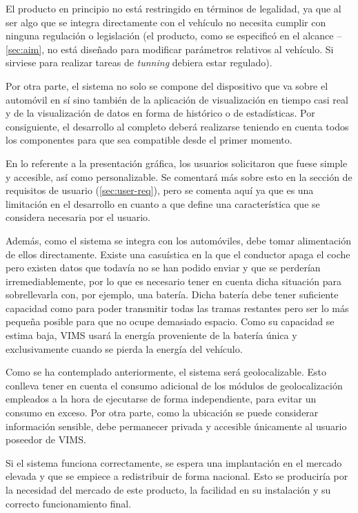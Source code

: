 El producto en principio no está restringido en términos de legalidad, ya que al
ser algo que se integra directamente con el vehículo no necesita cumplir con
ninguna regulación o legislación (el producto, como se especificó en el alcance
-- \ref{sec:aim}, no está diseñado para modificar parámetros relativos al
vehículo. Si sirviese para realizar tareas de \textit{tunning} debiera estar
regulado).

Por otra parte, el sistema no solo se compone del dispositivo que va sobre el
automóvil en sí sino también de la aplicación de visualización en tiempo casi
real y de la visualización de datos en forma de histórico o de estadísticas. Por
consiguiente, el desarrollo al completo deberá realizarse teniendo en cuenta
todos los componentes para que sea compatible desde el primer momento.

En lo referente a la presentación gráfica, los usuarios solicitaron que fuese
simple y accesible, así como personalizable. Se comentará más sobre esto en la
sección de requisitos de usuario (\ref{sec:user-req}), pero se comenta aquí ya
que es una limitación en el desarrollo en cuanto a que define una característica
que se considera necesaria por el usuario.

Además, como el sistema se integra con los automóviles, debe tomar alimentación de
ellos directamente. Existe una casuística en la que el conductor apaga el
coche pero existen datos que todavía no se han podido enviar y que se
perderían irremediablemente, por lo que es necesario tener en cuenta dicha
situación para sobrellevarla con, por ejemplo, una batería. Dicha batería
debe tener suficiente capacidad como para poder transmitir todas las tramas
restantes pero ser lo más pequeña posible para que no ocupe demasiado espacio.
Como su capacidad se estima baja,
\ac{VIMS} usará la energía proveniente de la batería única y exclusivamente
cuando se pierda la energía del vehículo.

Como se ha contemplado anteriormente, el sistema será geolocalizable. Esto
conlleva tener en cuenta el consumo adicional de los módulos de geolocalización
empleados a la hora de ejecutarse de forma independiente, para evitar un consumo en
exceso. Por otra parte, como la ubicación se puede considerar información sensible,
debe permanecer privada y accesible únicamente al usuario poseedor de \ac{VIMS}.

Si el sistema funciona correctamente, se espera una implantación en el mercado
elevada y que se empiece a redistribuir de forma nacional. Esto se produciría
por la necesidad del mercado de este producto, la facilidad en su instalación y
su correcto funcionamiento final.